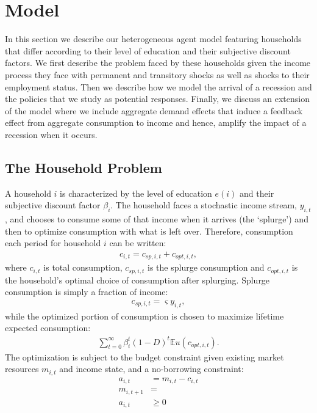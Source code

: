 \documentclass[../HAFiscal]{subfiles}
\begin{document}
	
\section{Model}

In this section we describe our heterogeneous agent model featuring households that differ according to their level of education and their subjective discount factors. We first describe the problem faced by these households given the income process they face with permanent and transitory shocks as well as shocks to their employment status. Then we describe how we model the arrival of a recession and the policies that we study as potential responses. Finally, we discuss an extension of the model where we include aggregate demand effects that induce a feedback effect from aggregate consumption to income and hence, amplify the impact of a recession when it occurs. 

\subsection{The Household Problem}
A household $i$ is characterized by the level of education $e(i)$ and their subjective discount factor $\beta_i$. The household faces a stochastic income stream, $y_{i,t}$, and chooses to consume some of that income when it arrives (the `splurge') and then to optimize consumption with what is left over. Therefore, consumption each period for household $i$ can be written:
\begin{align}
	c_{i,t} = c_{sp,i,t} + c_{opt,i,t},
\end{align}
where $c_{i,t}$ is total consumption, $c_{sp,i,t}$ is the splurge consumption and $c_{opt,i,t}$ is the household's optimal choice of consumption after splurging. Splurge consumption is simply a fraction of income:
\begin{align}
c_{sp,i,t} = \varsigma y_{i,t},
\end{align}
while the optimized portion of consumption is chosen to maximize lifetime expected consumption:
\begin{align}
\sum_{t=0}^{\infty}\beta_i^t (1-D)^t \mathbb{E}u(c_{opt,i,t}).
\end{align}
The optimization is subject to the budget constraint given existing market resources $m_{i,t}$ and income state, and a no-borrowing constraint: 
\begin{align}
	a_{i,t} &= m_{i,t} - c_{i,t} \\ 
	m_{i,t+1} &=  \\
	a_{i,t} &\geq 0 
\end{align}
\end{document}
